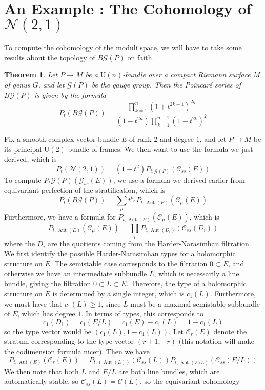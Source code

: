 \documentclass[psamsfonts, 12pt]{amsart}
\newtheorem{thm}{Theorem}[section]
\theoremstyle{definition}
\theoremstyle{remark}
\DeclareMathOperator{\Aut}{Aut}
\begin{document}
\section{An Example : The Cohomology of $\mathcal{N}(2,1)$}
%
To compute the cohomology of the moduli space, we will have to take some results
about the topology of $B\mathscr{G}(P)$ on faith.
%
\begin{thm}
Let $P \to M$ be a $\mathrm{U}(n)$-bundle over a compact Riemann surface $M$ of
genus $G$, and let $\mathscr{G}(P)$ be the gauge group. Then the Poincar\'e series
of $B\mathscr{G}(P)$ is given by the formula
\[
P_t(B\mathscr{G}(P))
= \frac{\prod_{k=1}^n(1+t^{2k-1})^{2g}}{(1-t^{2n})\prod_{k=1}^{n-1}(1-t^{2k})^2}
\]
\end{thm}
%
Fix a smooth complex vector bundle $E$ of rank $2$ and degree $1$, and let $P \to M$
be its principal $\mathrm{U}(2)$ bundle of frames. We then want to use the formula we
just derived, which is
\[
P_t(\mathcal{N}(2,1)) = (1-t^2)P_{t,\mathscr{G}(P)}(\mathscr{C}_{ss}(E))
\]
To compute $P_t{\mathscr{G}(P)}(\mathscr{G}_{ss}(E))$, we use a formula we derived
earlier from equivariant perfection of the stratification, which is
\[
P_t(B\mathscr{G}(P)) = \sum_\mu t^{k_\mu} P_{t,\Aut(E)}(\mathscr{C}_\mu(E))
\]
Furthermore, we have a formula for $P_{t,\Aut(E)}(\mathscr{C}_\mu(E))$, which is
\[
P_{t,\Aut(E)}(\mathscr{C}_\mu(E)) = \prod_i P_{t,\Aut(D_i)}(\mathscr{C}_{ss}(D_i))
\]
where the $D_i$ are the quotients coming from the Harder-Narasimhan filtration.
We first identify the possible Harder-Narasimhan types for a holomorphic structure
on $E$. The semistable case corresponds to the filtration $0 \subset E$, and otherwise
we have an intermediate subbundle $L$, which is necessarily a line bundle,
giving the filtration $0 \subset L \subset E$. Therefore, the type of a holomorphic
structure on $E$ is determined by a single integer, which is $c_1(L)$. Furthermore,
we must have that $c_1(L) \geq 1$, since $L$ must be a maximal semistable subbundle of
$E$, which has degree $1$. In terms of types, this corresponds to
\[
c_1(D_1) = c_1(E/L) = c_1(E) - c_1(L) = 1 - c_1(L)
\]
so the type vector would be $(c_1(L), 1-c_1(L))$. Let $\mathscr{C}_r(E)$ denote
the stratum corresponding to the type vector $(r+1, -r)$ (this notation will make
the codimension formula nicer). Then we have
\[
P_{t,\Aut(E)}(\mathscr{C}_r(E))
= P_{t,(\Aut(L))}(\mathscr{C}_{ss}(L)) P_{t,\Aut(E/L)}(\mathscr{C}_{ss}(E/L))
\]
We then note that both $L$ and $E/L$ are both line bundles, which are automatically
stable, so $\mathscr{C}_{ss}(L) = \mathscr{C}(L)$, so the equivariant cohomology
\end{document}
